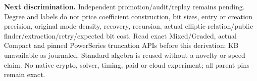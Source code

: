 \documentclass[10pt]{article}
\begin{document}
\textbf{Next discrimination.} Independent promotion/audit/replay remains
pending. Degree and labels do not price coefficient construction, bit sizes,
entry or creation precision, original mode density, recovery, recursion,
actual elliptic relation/public finder/extraction/retry/expected bit cost.
Read exact Mixed/Graded, actual Compact and pinned PowerSeries truncation
APIs before this derivation; KB unavailable as journaled. Standard algebra
is reused without a novelty or speed claim. No native crypto, solver,
timing, paid or cloud experiment; all parent pins remain exact.
\end{document}
